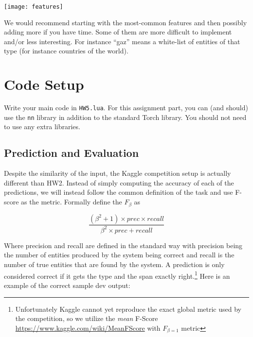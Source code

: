 \documentclass[11pt]{article}
\begin{document}
\begin{center}
  \texttt{[image: features]}
\end{center}

We would recommend starting with the most-common features and then
possibly adding more if you have time. Some of them are more difficult
to implement and/or less interesting. For instance ``gaz'' means a
white-list of entities of that type (for instance countries of the
world).

\section{Code Setup}

Write your main code in \texttt{HW5.lua}. For this assignment part,
you can (and should) use the \texttt{nn} library in addition to the
standard Torch library. You should not need to use any extra libraries.

\subsection{Prediction and Evaluation}

Despite the similarity of the input, the Kaggle competition setup is
actually different than HW2. Instead of simply computing the accuracy
of each of the predictions, we will instead follow the common
definition of the task and use F-score as the metric. Formally define
the $F_{\beta}$ as

\[ \frac{(\beta^2 + 1) \times prec \times recall}{\beta^2  \times prec + recall} \]  

Where precision and recall are defined in the standard way with
precision being the number of entities produced by the system being
correct and recall is the number of true entities that are found by
the system. A prediction is only considered correct if it gets the
type and the span exactly right.\footnote{Unfortunately Kaggle cannot yet
reproduce the exact global metric used by the competition, so we
utilize the \textit{mean} F-Score
\url{https://www.kaggle.com/wiki/MeanFScore} with $F_{\beta=1}$
metric} Here is an example of the correct sample dev output:



\end{document}

